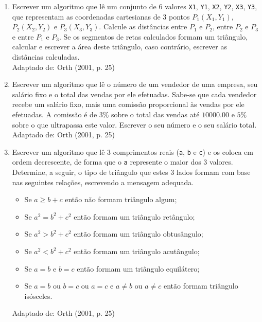 \documentclass[onecolumn,a4paper,10pt]{report}
\newcommand{\+}{\, + \,}
\newcommand{\<}{\hspace*{-0.4cm}}
\begin{document}
\begin{enumerate}[1.]
\item Escrever um algoritmo que lê um conjunto de 6 valores \texttt{X1}, \texttt{Y1}, \texttt{X2}, \texttt{Y2}, \texttt{X3}, \texttt{Y3}, que representam as coordenadas cartesianas de 3 pontos $P_1(X_1,Y_1)$, $P_2(X_2,Y_2)$ e $P_3(X_3,Y_3)$. Calcule as distâncias entre $P_1$ e $P_2$, entre $P_2$ e $P_3$ e entre $P_1$ e $P_3$. Se os segmentos de retas calculados formam um triângulo, calcular e escrever a área deste triângulo, caso contrário, escrever as distâncias calculadas.\\
{\tiny Adaptado de: Orth (2001, p. 25)}

\item Escrever um algoritmo que lê o número de um vendedor de uma empresa, seu salário fixo e o total das vendas por ele efetuadas. Sabe-se que cada vendedor recebe um salário fixo, mais uma comissão proporcional às vendas por ele efetuadas. A comissão é de $3\%$ sobre o total das vendas até $10000.00$ e $5\%$ sobre o que ultrapassa este valor. Escrever o seu número e o seu salário total.\\
{\tiny Adaptado de: Orth (2001, p. 25)}

\item Escrever um algoritmo que lê 3 comprimentos reais (\texttt{a}, \texttt{b} e \texttt{c}) e os coloca em ordem decrescente, de forma que o \texttt{a} represente o maior dos 3 valores. Determine, a seguir, o tipo de triângulo que estes 3 lados formam com base nas seguintes relações, escrevendo a mensagem adequada.
\begin{itemize}
    \item Se $a \geq b + c$ então não formam triângulo algum;
    \item Se $a^2 = b^2 + c^2$ então formam um triângulo retângulo;
    \item Se $a^2 > b^2 + c^2$ então formam um triângulo obtusângulo;
    \item Se $a^2 < b^2 + c^2$ então formam um triângulo acutângulo;
    \item Se $a = b$ e $b = c$ então formam um triângulo equilátero;
    \item Se $a = b$ ou $b = c$ ou $a = c$ e $a \neq b$ ou $a \neq c$ então formam triângulo isósceles.
\end{itemize}
{\tiny Adaptado de: Orth (2001, p. 25)}


\end{enumerate}
\end{document}
